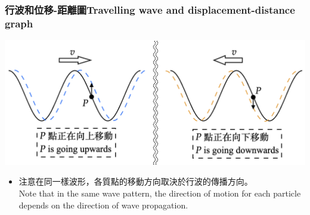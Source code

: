 \documentclass[beamer=true]{standalone}
\begin{document}
\begin{frame}
    \frametitle{行波和位移-距離圖Travelling wave and displacement-distance graph}
    \par{\par\centering\includegraphics[width=\textwidth]{./img/ch1_2024-05-09-14-58-40.png}\par}
    \begin{itemize}
        \item 注意在同一樣波形，各質點的移動方向取決於行波的傳播方向。\\ Note that in the same wave pattern, the direction of motion for each particle depends on the direction of wave propagation.
    \end{itemize}
\end{frame}
\end{document}
